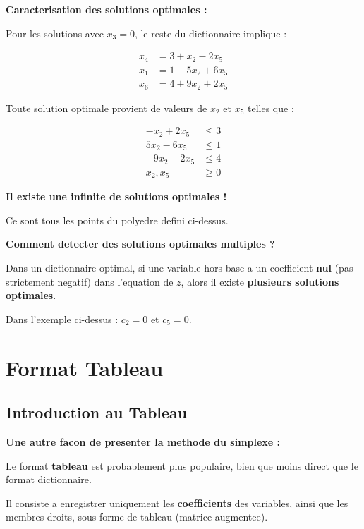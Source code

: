 \documentclass[12pt,a4paper]{article}
\begin{document}
\begin{exemple}
\textbf{Caracterisation des solutions optimales :}

Pour les solutions avec $x_3 = 0$, le reste du dictionnaire implique :

\begin{align*}
x_4 &= 3 + x_2 - 2x_5\\
x_1 &= 1 - 5x_2 + 6x_5\\
x_6 &= 4 + 9x_2 + 2x_5
\end{align*}

Toute solution optimale provient de valeurs de $x_2$ et $x_5$ telles que :

\begin{align*}
-x_2 + 2x_5 &\leq 3\\
5x_2 - 6x_5 &\leq 1\\
-9x_2 - 2x_5 &\leq 4\\
x_2, x_5 &\geq 0
\end{align*}

\textcolor{titrebleu}{\textbf{Il existe une infinite de solutions optimales !}}

Ce sont tous les points du polyedre defini ci-dessus.
\end{exemple}

\begin{astuce}
\textbf{Comment detecter des solutions optimales multiples ?}

Dans un dictionnaire optimal, si une variable hors-base a un coefficient \textcolor{defvert}{\textbf{nul}} (pas strictement negatif) dans l'equation de $z$, alors il existe \textcolor{titrebleu}{\textbf{plusieurs solutions optimales}}.

Dans l'exemple ci-dessus : $\bar{c}_2 = 0$ et $\bar{c}_5 = 0$.
\end{astuce}

\newpage
\section{Format Tableau}

\subsection{Introduction au Tableau}

\begin{notecours}
\textbf{Une autre facon de presenter la methode du simplexe :}

Le format \textcolor{algoviolet}{\textbf{tableau}} est probablement plus populaire, bien que moins direct que le format dictionnaire.

Il consiste a enregistrer uniquement les \textcolor{titrebleu}{\textbf{coefficients}} des variables, ainsi que les membres droits, sous forme de tableau (matrice augmentee).
\end{notecours}
\end{document}
